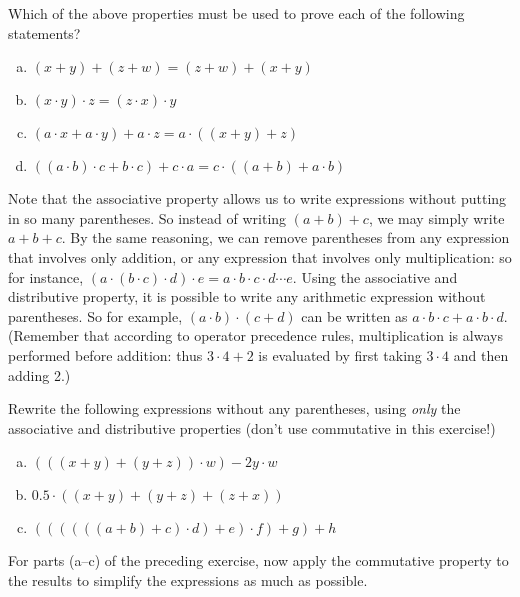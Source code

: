\begin{exercise}{}
Which of the above properties must be used to prove each of the following statements?
\begin{enumerate}[(a)]
\item
$(x+y)+(z+w) = (z+w)+(x+y)$
\item
$(x \cdot y) \cdot z = ( z \cdot  x) \cdot y$
\item
$(a\cdot x + a \cdot y) + a \cdot z = a \cdot ( (x+y) + z)$
\item
$((a \cdot b) \cdot c + b \cdot c) + c \cdot a = c \cdot ((a+b) + a \cdot b)$
\end{enumerate}
\end{exercise} 

Note that the associative property allows us to write expressions without putting in so many parentheses.  So instead of writing $(a+b)+c$, we may simply write $a+b+c$. By the same reasoning, we can remove parentheses from any expression that involves only addition, or any expression that involves only multiplication: so for instance, $(a \cdot (b \cdot c) \cdot d) \cdot e = a \cdot b \cdot c \cdot d \cdots e$. Using the associative and distributive property, it is possible to write any arithmetic expression without parentheses. So for example, $(a \cdot b) \cdot (c + d)$ can be written as $a \cdot b \cdot c + a \cdot b \cdot d$.  (Remember that according to operator precedence rules, multiplication is always performed before addition: thus $3 \cdot 4 + 2$ is evaluated by first taking $3 \cdot 4$ and then adding 2.)

\begin{exercise}{}
Rewrite the following expressions without any parentheses, using \emph{only} the  associative and distributive properties  (don't use commutative in this exercise!)
\begin{enumerate}[(a)]
\item
$(((x + y) + (y+z))\cdot w) - 2y \cdot w$
\item
$0.5 \cdot ( (x+y) + (y + z) + (z + x))$
\item
$((((((a+b)+c) \cdot d)+ e) \cdot f) + g) + h$
\end{enumerate}
\end{exercise}

\begin{exercise}{}
For parts (a--c) of the preceding exercise, now apply the commutative property to the results to simplify the expressions as much as possible.
\end{exercise}

